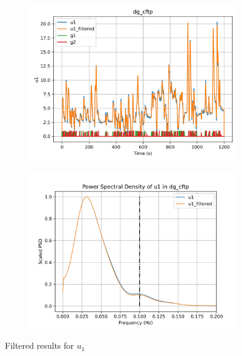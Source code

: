 \begin{figure}[H]

\begin{minipage}{0.49\textwidth}
        \begin{figure}[H]
                \centering
                \includegraphics[width = \textwidth]{./figs/tst_filt/dg_cftp/u1.png}
        \end{figure}
\end{minipage}
\begin{minipage}{0.49\textwidth}
        \begin{figure}[H]
                \centering
                \includegraphics[width = \textwidth]{./figs/tst_filt/dg_cftp/u1_psd.png}
        \end{figure}
\end{minipage}
\caption{Filtered results for $u_1$}

\end{figure}


